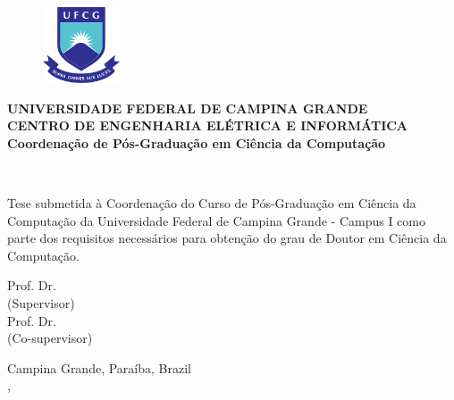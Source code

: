 \begin{figure}[H]
\centering
\includegraphics[height=85px]{images/logo_ufcg.png}
\end{figure}

\begin{center}
\textbf{UNIVERSIDADE FEDERAL DE CAMPINA GRANDE} \\
\textbf{CENTRO DE ENGENHARIA ELÉTRICA E INFORMÁTICA} \\
\textbf{Coordenação de Pós-Graduação em Ciência da Computação}
\vspace{3em}

\Large{}
\thetitle
\vspace{3em}

\Large{\theauthor}\\
\vspace{2em}

\normalsize{\parbox[t]{122mm}{Tese submetida à Coordenação do Curso de Pós-Graduação em Ciência da Computação da Universidade Federal de Campina Grande - Campus I como parte dos requisitos necessários para obtenção do grau de Doutor em Ciência da Computação.}}
\vspace{6em}


Prof. Dr. \profa\\
(Supervisor) \\
\vspace{1em}
Prof. Dr. \profb\\
(Co-supervisor)
\vfill

Campina Grande, Paraíba, Brazil \\
\MONTH, \the\year
\end{center}